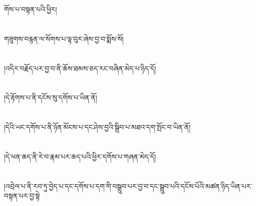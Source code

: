 གོས་པ་བསྟན་པའི་ཕྱིར།\chapter{ }གཟུགས་བརྙན་ལ་སོགས་པ་ལྟ་བུར་ཞེས་བྱ་བ་སྨོས་སོ།\chapter{ }།འདིར་བརྗོད་པར་བྱ་བ་ནི་ཆོས་ཐམས་ཅད་རང་བཞིན་མེད་པ་ཉིད་དོ།\chapter{ }།དེ་རྟོགས་པ་ནི་དངོས་སུ་དགོས་པ་ཡིན་ནོ།\chapter{ }།དེའི་ཡང་དགོས་པ་ནི་ཉོན་མོངས་པ་དང་ཤེས་བྱའི་སྒྲིབ་པ་མཐའ་དག་སྤོང་བ་ཡིན་ནོ།\chapter{ }།དེ་ཕན་ཆད་ནི་རེ་བ་རྣམ་པར་ཆད་པའི་ཕྱིར་དགོས་པ་གཞན་མེད་དོ།\chapter{ }།འབྲེལ་པ་ནི་རབ་ཏུ་བྱེད་པ་དང་དགོས་པ་དག་གི་བསྒྲུབ་པར་བྱ་བ་དང་སྒྲུབ་པའི་དངོས་པོའི་མཚན་ཉིད་ཡིན་པར་བསྟན་པར་བྱ་སྟེ